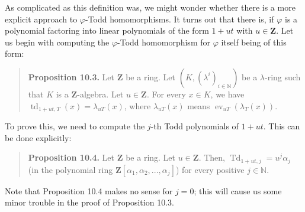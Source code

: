 \documentclass[numbers=enddot,12pt,final,onecolumn,notitlepage]{scrartcl}%
\begin{document}
As complicated as this definition was, we might wonder whether there is a more
explicit approach to $\varphi$-Todd homomorphisms. It turns out that there is,
if $\varphi$ is a polynomial factoring into linear polynomials of the form
$1+ut$ with $u\in\mathbf{Z}$. Let us begin with computing the $\varphi$-Todd
homomorphism for $\varphi$ itself being of this form:

\begin{quote}
\textbf{Proposition 10.3.} Let $\mathbf{Z}$ be a ring. Let $\left(  K,\left(
\lambda^{i}\right)  _{i\in\mathbb{N}}\right)  $ be a $\lambda$-ring such that
$K$ is a $\mathbf{Z}$-algebra. Let $u\in\mathbf{Z}$. For every $x\in K$, we
have $\operatorname*{td}\nolimits_{1+ut,T}\left(  x\right)  =\lambda
_{uT}\left(  x\right)  $, where $\lambda_{uT}\left(  x\right)  $ means
$\operatorname*{ev}\nolimits_{uT}\left(  \lambda_{T}\left(  x\right)  \right)
$.
\end{quote}

To prove this, we need to compute the $j$-th Todd polynomials of $1+ut$. This
can be done explicitly:

\begin{quote}
\textbf{Proposition 10.4.} Let $\mathbf{Z}$ be a ring. Let $u\in\mathbf{Z}$.
Then, $\operatorname*{Td}\nolimits_{1+ut,j}=u^{j}\alpha_{j}$ (in the
polynomial ring $\mathbf{Z}\left[  \alpha_{1},\alpha_{2},...,\alpha
_{j}\right]  $) for every positive $j\in\mathbb{N}$.
\end{quote}

Note that Proposition 10.4 makes no sense for $j=0$; this will cause us some
minor trouble in the proof of Proposition 10.3.
\end{document}

